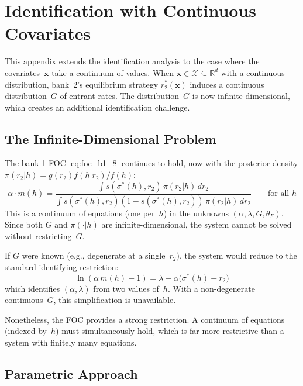 \documentclass[12pt]{article}
\theoremstyle{plain}
\theoremstyle{plain}
\theoremstyle{definition}
\theoremstyle{remark}
\begin{document}
\printbibliography


\newpage
\appendix
\section{Identification with Continuous Covariates}\label{app:continuous_x}

This appendix extends the identification analysis to the case where the covariates~$\mathbf{x}$ take a continuum of values.  When $\mathbf{x} \in \mathcal{X} \subseteq \mathbb{R}^d$ with a continuous distribution, bank~2's equilibrium strategy $r_2^*(\mathbf{x})$ induces a continuous distribution~$G$ of entrant rates.  The distribution~$G$ is now infinite-dimensional, which creates an additional identification challenge.

\subsection{The Infinite-Dimensional Problem}

The bank-1 FOC \eqref{eq:foc_b1_8} continues to hold, now with the posterior density $\pi(r_2|h) = g(r_2) f(h|r_2) / f(h)$:
\[
    \alpha \cdot m(h) = \frac{\int s(\sigma^*(h), r_2)\, \pi(r_2|h)\, dr_2}{\int s(\sigma^*(h), r_2)(1-s(\sigma^*(h), r_2))\, \pi(r_2|h)\, dr_2} \qquad \text{for all } h
\]
This is a continuum of equations (one per~$h$) in the unknowns $(\alpha, \lambda, G, \theta_F)$.  Since both $G$ and $\pi(\cdot|h)$ are infinite-dimensional, the system cannot be solved without restricting~$G$.

If $G$ were known (e.g., degenerate at a single~$r_2$), the system would reduce to the standard identifying restriction:
\[
    \ln(\alpha\, m(h) - 1) = \lambda - \alpha\big(\sigma^*(h) - r_2\big)
\]
which identifies $(\alpha, \lambda)$ from two values of~$h$.  With a non-degenerate continuous~$G$, this simplification is unavailable.

Nonetheless, the FOC provides a strong restriction.  A continuum of equations (indexed by~$h$) must simultaneously hold, which is far more restrictive than a system with finitely many equations.

\subsection{Parametric Approach}
\end{document}
